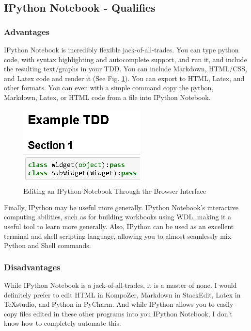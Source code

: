 \documentclass[]{article}
\begin{document}
\subsection{IPython Notebook - Qualifies}
	\subsubsection{Advantages}
		IPython Notebook is incredibly flexible jack-of-all-trades.  
		You can type python code, with syntax highlighting and autocomplete support, and run it, and include the resulting text/graphs in your TDD.  
		You can include Markdown, HTML/CSS, and Latex code and render it (See Fig. \ref{IPython}).  
		You can export to HTML, Latex, and other formats.  
		You can even with a simple command copy the python, Markdown, Latex, or HTML code from a file into IPython Notebook.
		
		\begin{figure}[h]
			\centering
			\includegraphics[scale=1]{IPython_Notebook.PNG}
			\caption{Editing an IPython Notebook Through the Browser Interface}
			\label{IPython}
		\end{figure}
		
		Finally, IPython may be useful more generally.  
		IPython Notebook's interactive computing abilities, such as for building workbooks using WDL, making it a useful tool to learn more generally.  
		Also, IPython can be used as an excellent terminal and shell scripting language, allowing you to almost seamlessly mix Python and Shell commands.
		
	\subsubsection{Disadvantages}
		While IPython Notebook is a jack-of-all-trades, it is a master of none.  
		I would definitely prefer to edit HTML in KompoZer, Markdown in StackEdit, Latex in TeXstudio, and Python in PyCharm.  
		And while IPython allows you to easily copy files edited in these other programs into you IPython Notebook, I don't know how to completely automate this.
		
\end{document}
